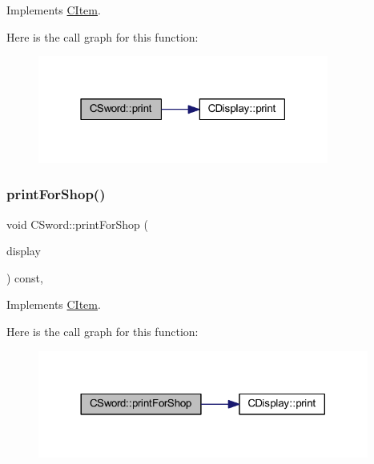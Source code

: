 Implements \mbox{\hyperlink{class_c_item_af35b9c64f05a8377298505b3a81bcd18}{C\+Item}}.

Here is the call graph for this function\+:\nopagebreak
\begin{figure}[H]
\begin{center}
\leavevmode
\includegraphics[width=271pt]{class_c_sword_a8d8f4502742e5905d2be1f4d0157b6be_cgraph}
\end{center}
\end{figure}
\mbox{\label{class_c_sword_a7871b74b03a5ee130925e7f20d8107ef}} 
\subsubsection{\texorpdfstring{print\+For\+Shop()}{printForShop()}}
{\footnotesize\ttfamily void C\+Sword\+::print\+For\+Shop (\begin{DoxyParamCaption}\item[{const \mbox{\hyperlink{class_c_display}{C\+Display}} \&}]{display }\end{DoxyParamCaption}) const\hspace{0.3cm}{\ttfamily [override]}, {\ttfamily [virtual]}}



Implements \mbox{\hyperlink{class_c_item_af56df4ab4d87984c56401231dd3492cf}{C\+Item}}.

Here is the call graph for this function\+:\nopagebreak
\begin{figure}[H]
\begin{center}
\leavevmode
\includegraphics[width=308pt]{class_c_sword_a7871b74b03a5ee130925e7f20d8107ef_cgraph}
\end{center}
\end{figure}
\mbox{\label{class_c_sword_a565b01124ed0c92e6873dcc0263d4a79}} 
